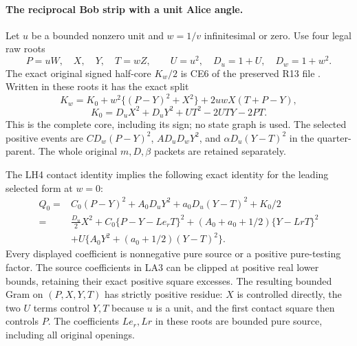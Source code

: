 \paragraph{The reciprocal Bob strip with a unit Alice angle.}
Let $u$ be a bounded nonzero unit and $w=1/v$ infinitesimal or zero.
Use four legal raw roots
\[
 P=uW,\quad X,\quad Y,\quad T=wZ,
 \qquad U=u^2,\quad D_u=1+U,\quad D_w=1+w^2.
\]
The exact original signed half-core $K_w/2$ is CE6 of the preserved
R13 file .
Written in these roots it has the exact split
\[
 K_w=K_0+w^2\{(P-Y)^2+X^2\}
                      +2uwX(T+P-Y),                         \tag{LA2}
\]
\[
 K_0=D_uX^2+D_uY^2+UT^2-2UTY-2PT.
\]
This is the complete core, including its sign; no state graph is used.
The selected positive events are
$CD_w(P-Y)^2$, $AD_uD_wY^2$, and
$\alpha D_u(Y-T)^2$ in the quarter-parent.  The whole original
$m,D,\beta$ packets are retained separately.

The LH4 contact identity implies the following exact identity for
the leading selected form at $w=0$:
\[
\begin{split}
 Q_0={}&C_0(P-Y)^2+A_0D_uY^2+a_0D_u(Y-T)^2+K_0/2\\
 ={}&\frac{D_u}{2}X^2
       +C_0\{P-Y-Le_rT\}^2
       +(A_0+a_0+1/2)\{Y-LrT\}^2\\
 &+U\{A_0Y^2+(a_0+1/2)(Y-T)^2\}.
\end{split}                                                   \tag{LA3}
\]
Every displayed coefficient is nonnegative pure source or a positive
pure-testing factor.  The source coefficients in LA3 can be clipped
at positive real lower bounds, retaining their exact positive square
excesses.  The resulting bounded Gram on $(P,X,Y,T)$ has strictly
positive residue: $X$ is controlled directly, the two $U$ terms
control $Y,T$ because $u$ is a unit, and the first contact square
then controls $P$.  The coefficients $Le_r,Lr$ in these roots are
bounded pure source, including all original openings.


